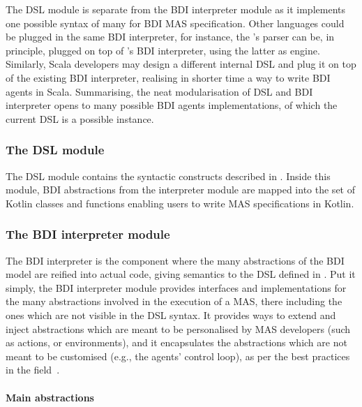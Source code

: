 The \ac{DSL} module is separate from the \ac{BDI} interpreter module
as it implements one possible syntax of many for \ac{BDI} \ac{MAS} specification.
%
Other languages could be plugged in the same \ac{BDI} interpreter,
for instance, the \jason{}'s parser can be, in principle, plugged on top of \jakta{}'s \ac{BDI} interpreter,
using the latter as engine.
%
Similarly, Scala developers may design a different internal \ac{DSL}
and plug it on top of the existing \ac{BDI} interpreter,
realising in shorter time a way to write \ac{BDI} agents in Scala.
%
Summarising, the neat modularisation of \ac{DSL} and \ac{BDI} interpreter opens to many possible \ac{BDI}
agents implementations, of which the current \jakta{} DSL is a possible instance.

\subsubsection{The \ac{DSL} module}

The \ac{DSL} module contains the syntactic constructs described in .
%
Inside this module, \ac{BDI} abstractions from the interpreter module are mapped into the set of Kotlin classes and functions
enabling users to write \ac{MAS} specifications in Kotlin.
%

\subsubsection{The \ac{BDI} interpreter module}
\label{subsec:bdi-interpreter}

The \ac{BDI} interpreter is the component where the many abstractions of the \ac{BDI} model are reified into actual code,
giving semantics to the \ac{DSL} defined in .
%
Put it simply, the \ac{BDI} interpreter module provides interfaces and implementations for the many abstractions
involved in the execution of a \ac{MAS}, there including the ones which are not visible in the \ac{DSL} syntax.
%
It provides ways to extend and inject abstractions which are meant to be personalised by \ac{MAS} developers
(such as actions, or environments),
and it encapsulates the abstractions which are not meant to be customised (e.g., the agents' control loop),
as per the best practices in the field~\cite{DBLP:journals/ase/DennisFWB12}.

\paragraph{Main abstractions}

